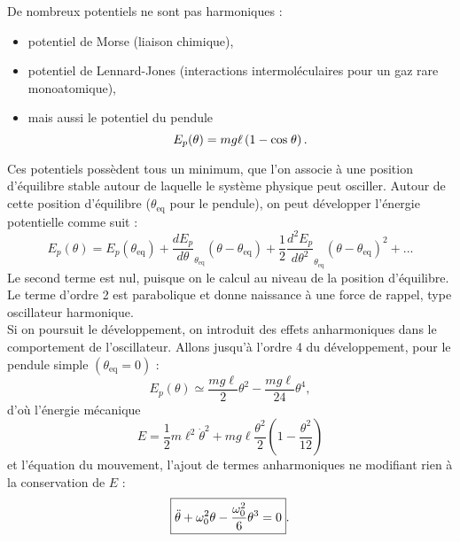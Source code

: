 \documentclass[11pt,a4paper]{report}
\begin{document}
De nombreux potentiels ne sont pas harmoniques :
\begin{itemize}
	\item potentiel de Morse (liaison chimique),
	\item potentiel de Lennard-Jones (interactions intermoléculaires pour un gaz rare 					monoatomique),
	\item mais aussi le potentiel du pendule
		\begin{equation}
			E_p(\theta) = mg\ell \left(1 - \text{cos}\;\theta \right).\\
		\end{equation}
\end{itemize}

Ces potentiels possèdent tous un minimum, que l'on associe à une position d'équilibre stable autour de laquelle le système physique peut osciller. Autour de cette position d'équilibre ($\theta_\text{eq}$ pour le pendule), on peut développer l'énergie potentielle comme suit :
\begin{equation}
	\boxed{E_p(\theta) = E_p(\theta_\text{eq}) + \frac{d E_p}{d\theta}_{\theta_\text{eq}} 			\left(\theta - \theta_\text{eq}\right) + \frac{1}{2} 
	\frac{d^2 E_p}{d\theta^2}_{\theta_\text{eq}}\left(\theta - \theta_\text{eq}\right)^2 + ...}
\end{equation}
Le second terme est nul, puisque on le calcul au niveau de la position d'équilibre. Le terme d'ordre 2 est parabolique et donne naissance à une force de rappel, type oscillateur harmonique.\\

Si on poursuit le développement, on introduit des effets anharmoniques dans le comportement de l'oscillateur. Allons jusqu'à l'ordre 4 du développement, pour le pendule simple $(\theta_\text{eq} = 0)$ :
\begin{equation}
	E_p(\theta) \simeq \frac{mg\ell}{2}\theta^2 - \frac{mg\ell}{24}\theta^4,
\end{equation} 
d'où l'énergie mécanique
\begin{equation}
	E = \frac{1}{2}m \ell^2 \dot{\theta}^2 + mg\ell \frac{\theta^2}{2}
	\left(1 - \frac{\theta^2}{12}\right)
\end{equation}
et l'équation du mouvement, l'ajout de termes anharmoniques ne modifiant rien à la conservation de $E$ :
\begin{equation}
	\boxed{\ddot{\theta} + \omega_0^2\theta - \frac{\omega_0^2}{6}\theta^3 = 0}.\\
\end{equation}
\end{document}
